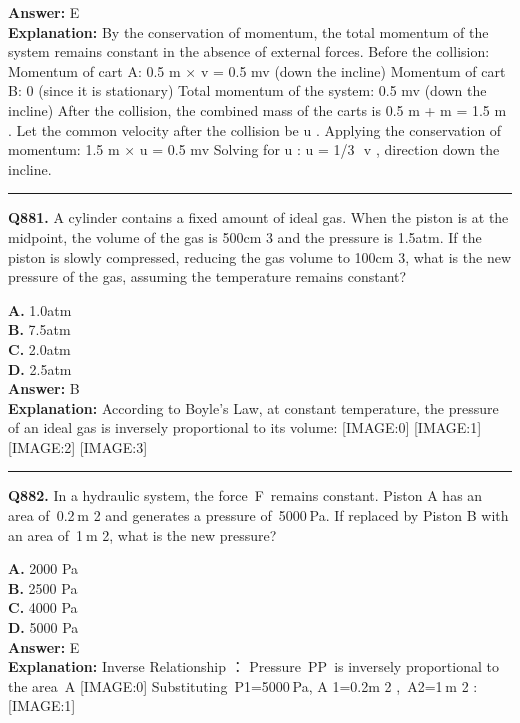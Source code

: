 \documentclass[12pt]{article}
\begin{document}
\textbf{Answer:} E \\
\textbf{Explanation:} By the conservation of momentum, the total momentum of the system remains constant in the absence of external forces. Before the collision:
\cdot 
Momentum of cart A:
0.5
m
×
v
=
0.5
mv
(down the incline)
\cdot 
Momentum of cart B: 0 (since it is stationary)
Total momentum of the system:
0.5
mv
(down the incline)
After the collision, the combined mass of the carts is
0.5
m
+
m
=
1.5
m
. Let the common velocity after the collision be
u
. Applying the conservation of momentum:
1.5
m
×
u
=
0.5
mv
Solving for
u
:
u
=
1/3
​
v
, direction down the incline.

\hrule
\vspace{1em}


\noindent
\textbf{Q881.} A cylinder contains a fixed amount of ideal gas. When the piston is at the midpoint, the volume of the gas is 500cm
3
and the pressure is 1.5atm. If the piston is slowly compressed, reducing the gas volume to 100cm
3,
what is the new pressure of the gas, assuming the temperature remains constant?



\textbf{A.} 1.0atm \\
\textbf{B.} 7.5atm \\
\textbf{C.} 2.0atm \\
\textbf{D.} 2.5atm \\

\textbf{Answer:} B \\
\textbf{Explanation:} According to Boyle's Law, at constant temperature, the pressure of an ideal gas is inversely proportional to its volume:
[IMAGE:0]
[IMAGE:1]
[IMAGE:2]
[IMAGE:3]

\hrule
\vspace{1em}


\noindent
\textbf{Q882.} In a hydraulic system, the force F remains constant. Piston A has an area of 0.2 m
2
and generates a pressure of 5000 Pa. If replaced by Piston B with an area of 1 m
2,
what is the new pressure?



\textbf{A.} 2000 Pa \\
\textbf{B.} 2500 Pa \\
\textbf{C.} 4000 Pa \\
\textbf{D.} 5000 Pa \\

\textbf{Answer:} E \\
\textbf{Explanation:} Inverse Relationship
：
Pressure PP is inversely proportional to the area A
[IMAGE:0]
Substituting P1=5000 Pa,
A
1​=0.2m
2
, A2=1 m
2
:
[IMAGE:1]
\end{document}
